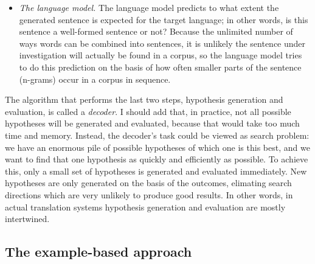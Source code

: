 \documentclass[12pt]{article}
\begin{document}
\begin{itemize}
\begin{itemize}
\item \emph{The language model.} The language model predicts to what extent the generated sentence is expected for the target language; in other words, is this sentence a well-formed sentence or not? Because the unlimited number of ways words can be combined into sentences, it is unlikely the sentence under investigation will actually be found in a corpus, so the language model tries to do this prediction on the basis of how often smaller parts of the sentence (n-grams) occur in a corpus in sequence.

\end{itemize}

\end{itemize}

The algorithm that performs the last two steps, hypothesis generation and evaluation, is called a \emph{decoder}. I should add that, in practice, not all possible hypotheses will be generated and evaluated, because that would take too much time and memory. Instead, the decoder's task could be viewed as search problem: we have an enormous pile of possible hypotheses of which one is this best, and we want to find that one hypothesis as quickly and efficiently as possible. To achieve this, only a small set of hypotheses is generated and evaluated immediately. New hypotheses are only generated on the basis of the outcomes, elimating search directions which are very unlikely to produce good results. In other words, in actual translation systems hypothesis generation and evaluation are mostly intertwined. 

\subsection{The example-based approach}
\end{document}
